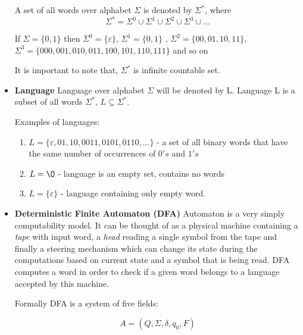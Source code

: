\documentclass{article}
\begin{document}
\begin{itemize}
A set of all words over alphabet $\Sigma$ is denoted by $\Sigma^*$,
where 
\begin{equation}
\Sigma^* = \Sigma^0 \cup \Sigma^1 \cup \Sigma^2 \cup \Sigma^3 \cup ...
\end{equation}

If $\Sigma = \{0,1\}$
then $\Sigma^0 = \{\varepsilon \}$, $\Sigma^1 = \{0,1\}$ , $\Sigma^2 = \{00, 01 ,10 ,11\}$,
$\Sigma^3 = \{000, 001, 010, 011, 100, 101, 110, 111\}$ and so on

It is important to note that, $\Sigma^*$ is infinite countable set.


\item {\bf Language}
Language over alphabet $\Sigma$ will be denoted by L.
Language L is a subset of all words $\Sigma^*$, $L \subseteq \Sigma^*$.

Examples of languages:
\begin{enumerate}

	\item 
	$L = \{\varepsilon, 01, 10, 0011, 0101, 0110, ...\}$ -
	a set of all binary words that have the same number of occurrences of $0's$ 	and $1's$
	
	\item 	$L = \O$ - language is an empty set, contains no words
	
	\item 	$L = \{\varepsilon \}$ - language containing only empty word.

\end{enumerate}



\item {\bf Deterministic Finite Automaton (DFA)}
Automaton is a very simply computability model.
It can be thought of as a physical machine containing a \textit{tape} with input word, a \textit{head} reading a single symbol from the tape and finally a steering mechanism which can change its state during the computations based on current state and a symbol that is being read.
DFA computes a word in order to check if a given word belongs to a language accepted by this machine.

Formally DFA is a system of five fields:

\begin{equation}
	A = (Q, \Sigma, \delta, q_0, F)
\end{equation}


\end{itemize}
\end{document}
